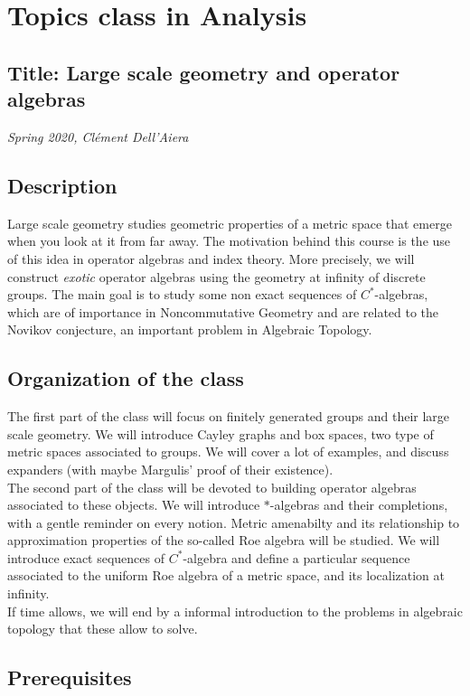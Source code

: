 \section{Topics class in Analysis}

\subsection*{Title: Large scale geometry and operator algebras}
\textit{Spring 2020, Cl\'ement Dell'Aiera}
\subsection*{Description} 
Large scale geometry studies geometric properties of a metric space that emerge when you look at it from far away. The motivation behind this course is the use of this idea in operator algebras and index theory. More precisely, we will construct \textit{exotic} operator algebras using the geometry at infinity of discrete groups. The main goal is to study some non exact sequences of $C^*$-algebras, which are of importance in Noncommutative Geometry and are related to the Novikov conjecture, an important problem in Algebraic Topology.

\subsection*{Organization of the class}
The first part of the class will focus on finitely generated groups and their large scale geometry. We will introduce Cayley graphs and box spaces, two type of metric spaces associated to groups. We will cover a lot of examples, and discuss expanders (with maybe Margulis' proof of their existence).\\

The second part of the class will be devoted to building operator algebras associated to these objects. We will introduce $*$-algebras and their completions, with a gentle reminder on every notion. Metric amenabilty and its relationship to approximation properties of the so-called Roe algebra will be studied. We will introduce exact sequences of $C^*$-algebra and define a particular sequence associated to the uniform Roe algebra of a metric space, and its localization at infinity.\\

If time allows, we will end by a informal introduction to the problems in algebraic topology that these allow to solve.  

\subsection*{Prerequisites}

